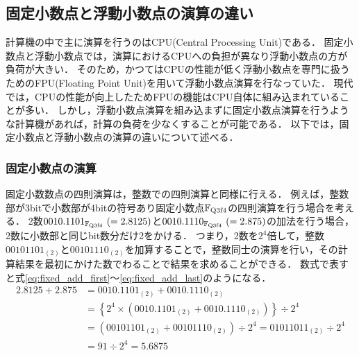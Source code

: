 \subsection{固定小数点と浮動小数点の演算の違い}
計算機の中で主に演算を行うのはCPU(Central Processing Unit)である．
固定小数点と浮動小数点では，演算におけるCPUへの負担が異なり浮動小数点の方が負荷が大きい．
そのため，かつてはCPUの性能が低く浮動小数点を専門に扱うためのFPU(Floating Point Unit)を用いて浮動小数点演算を行なっていた．
現代では，CPUの性能が向上したためFPUの機能はCPU自体に組み込まれていることが多い．
しかし，浮動小数点演算を組み込まずに固定小数点演算を行うような計算機があれば，計算の負荷を少なくすることが可能である．
以下では，固定小数点と浮動小数点の演算の違いについて述べる．

\subsubsection{固定小数点の演算}
固定小数数点の四則演算は，整数での四則演算と同様に行える．
例えば，整数部が3bitで小数部が4bitの符号あり固定小数点$\mathbb{F}_{\text{Q}{3}\text{f}{4}}$の四則演算を行う場合を考える．
2数$0010.1101_{\mathbb{F}_{\text{Q}{3}\text{f}{4}}} \ (= 2.8125)$と$0010.1110_{\mathbb{F}_{\text{Q}{3}\text{f}{4}}} \ (= 2.875)$の加法を行う場合，2数に小数部と同じbit数分だけ2をかける．
つまり，2数を$2^4$倍して，整数$00101101_{(2)}$と$00101110_{(2)}$を加算することで，整数同士の演算を行い，その計算結果を最初にかけた数でわることで結果を求めることができる．
数式で表すと式\eqref{eq:fixed_add_first}〜\eqref{eq:fixed_add_last}のようになる．
\begin{align}
    2.8125 + 2.875 &=
    0010.1101_{(2)} + 0010.1110_{(2)} \label{eq:fixed_add_first} \\
    &= \left\{ 2^4 \times \left(0010.1101_{(2)} + 0010.1110_{(2)}\right) \right\} \div 2^4 \\
    &= \left(00101101_{(2)} + 00101110_{(2)} \right) \div 2^4= 01011011_{(2)} \div 2^4\\
    &= 91 \div 2^4 = 5.6875 \label{eq:fixed_add_last}
\end{align}

